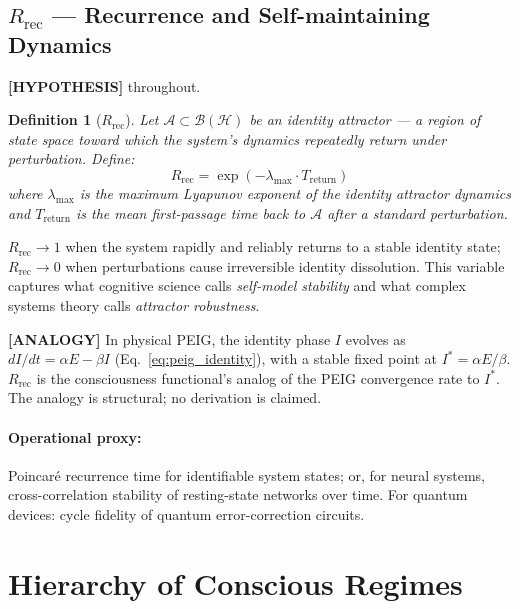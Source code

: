 \documentclass[12pt,letterpaper]{article}
\newtheorem{definition}{Definition}[section]
\newcommand{\HYPOTHESIS}[1]{\textcolor{blue!70!black}{\textbf{[HYPOTHESIS]}} #1}
\newcommand{\ANALOGY}[1]{\textcolor{orange!70!black}{\textbf{[ANALOGY]}} #1}
\newcommand{\Rrec}{R_{\mathrm{rec}}}
\begin{document}
\subsection{\texorpdfstring{$\Rrec$ — Recurrence and Self-maintaining Dynamics}{Rrec — Recurrence}}
\label{sec:Rrec}

\HYPOTHESIS{} throughout.

\begin{definition}[$\Rrec$]
Let $\mathcal{A} \subset \mathcal{B}(\mathcal{H})$ be an identity attractor
--- a region of state space toward which the system's dynamics repeatedly
return under perturbation. Define:
\begin{equation}
  \Rrec = \exp\!\left(-\lambda_{\max} \cdot T_{\mathrm{return}}\right)
  \label{eq:Rrec}
\end{equation}
where $\lambda_{\max}$ is the maximum Lyapunov exponent of the identity
attractor dynamics and $T_{\mathrm{return}}$ is the mean first-passage time
back to $\mathcal{A}$ after a standard perturbation.
\end{definition}

$\Rrec \to 1$ when the system rapidly and reliably returns to a stable
identity state; $\Rrec \to 0$ when perturbations cause irreversible
identity dissolution. This variable captures what cognitive science calls
\emph{self-model stability} and what complex systems theory calls
\emph{attractor robustness}.

\ANALOGY{} In physical PEIG, the identity phase $I$ evolves as
$dI/dt = \alpha E - \beta I$ (Eq.~\eqref{eq:peig_identity}), with a
stable fixed point at $I^* = \alpha E / \beta$. $\Rrec$ is the
consciousness functional's analog of the PEIG convergence rate to $I^*$.
The analogy is structural; no derivation is claimed.

\paragraph{Operational proxy:} Poincaré recurrence time for identifiable
system states; or, for neural systems, cross-correlation stability of
resting-state networks over time. For quantum devices: cycle fidelity
of quantum error-correction circuits.

\section{Hierarchy of Conscious Regimes}
\label{sec:hierarchy}
\end{document}
